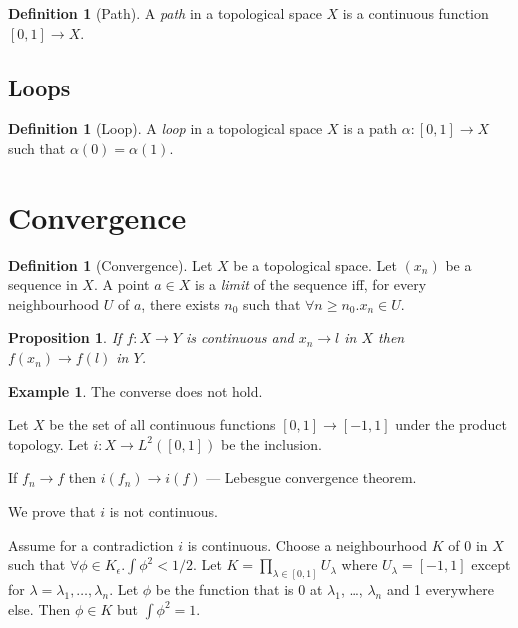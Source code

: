 \documentclass{book}
\newtheorem{prop}[ax]{Proposition}
\theoremstyle{definition}
\newtheorem{df}[ax]{Definition}
\newtheorem{ex}[ax]{Example}
\begin{document}
\begin{df}[Path]
A \emph{path} in a topological space $X$ is a continuous function $[0,1] \rightarrow X$.
\end{df}

\subsection{Loops}

\begin{df}[Loop]
A \emph{loop} in a topological space $X$ is a path $\alpha : [0,1] \rightarrow X$ such that $\alpha(0) = \alpha(1)$.
\end{df}

\section{Convergence}

\begin{df}[Convergence]
Let $X$ be a topological space. Let $(x_n)$ be a sequence in $X$. A point $a \in X$ is a \emph{limit} of the sequence iff, for every neighbourhood $U$ of $a$, there exists $n_0$ such that $\forall n \geq n_0. x_n \in U$.
\end{df}

\begin{prop}
\label{prop:continuous_converge}
If $f : X \rightarrow Y$ is continuous and $x_n \rightarrow l$ in $X$ then $f(x_n) \rightarrow f(l)$ in $Y$.
\end{prop}


\begin{ex}
The converse does not hold.

Let $X$ be the set of all continuous functions $[0,1] \rightarrow [-1,1]$ under the product topology. Let $i : X \rightarrow L^2([0,1])$ be the inclusion.

If $f_n \rightarrow f$ then $i(f_n) \rightarrow i(f)$ --- Lebesgue convergence theorem.

We prove that $i$ is not continuous.

Assume for a contradiction $i$ is continuous. Choose a neighbourhood $K$ of 0 in $X$ such that $\forall \phi \in K _\epsilon. \int \phi^2 < 1/2$. Let $K = \prod_{\lambda \in [0,1]} U_\lambda$ where $U_\lambda = [-1,1]$ except for $\lambda = \lambda_1, \ldots, \lambda_n$. Let $\phi$ be the function that is 0 at $\lambda_1$, \ldots, $\lambda_n$ and 1 everywhere else. Then $\phi \in K$ but $\int \phi^2 = 1$.
\end{ex}
\end{document}
